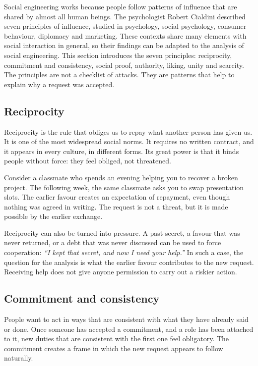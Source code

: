 Social engineering works because people follow patterns of influence that are shared by almost all human beings. The psychologist Robert Cialdini described seven principles of influence, studied in psychology, social psychology, consumer behaviour, diplomacy and marketing. These contexts share many elements with social interaction in general, so their findings can be adapted to the analysis of social engineering. This section introduces the seven principles: reciprocity, commitment and consistency, social proof, authority, liking, unity and scarcity. The principles are not a checklist of attacks. They are patterns that help to explain why a request was accepted.

\subsection{Reciprocity}
Reciprocity is the rule that obliges us to repay what another person has given us. It is one of the most widespread social norms. It requires no written contract, and it appears in every culture, in different forms. Its great power is that it binds people without force: they feel obliged, not threatened.

Consider a classmate who spends an evening helping you to recover a broken project. The following week, the same classmate asks you to swap presentation slots. The earlier favour creates an expectation of repayment, even though nothing was agreed in writing. The request is not a threat, but it is made possible by the earlier exchange.

Reciprocity can also be turned into pressure. A past secret, a favour that was never returned, or a debt that was never discussed can be used to force cooperation: \emph{``I kept that secret, and now I need your help.''} In such a case, the question for the analysis is what the earlier favour contributes to the new request. Receiving help does not give anyone permission to carry out a riskier action.

\subsection{Commitment and consistency}
People want to act in ways that are consistent with what they have already said or done. Once someone has accepted a commitment, and a role has been attached to it, new duties that are consistent with the first one feel obligatory. The commitment creates a frame in which the new request appears to follow naturally.

